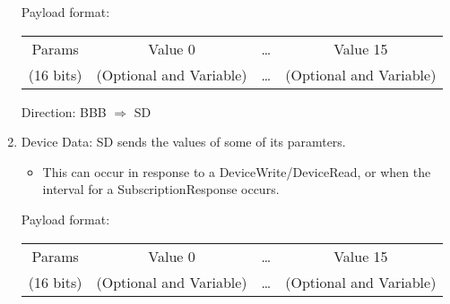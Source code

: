 \documentclass[12pt]{book}
\begin{document}
\begin{enumerate}
        Payload format:
        \begin{center}
            \begin{tabular}{|c|c|c|c|}
                \hline
                Params & Value 0 & \ldots & Value 15 \\
                (16 bits) & (Optional and Variable) & \ldots & (Optional and Variable) \\
                \hline
            \end{tabular}
        \end{center}
        Direction: BBB $\Rightarrow$ SD
    \item Device Data: SD sends the values of some of its paramters.
        \begin{itemize}
            \item This can occur in response to a DeviceWrite/DeviceRead, or when the
                interval for a SubscriptionResponse occurs.
        \end{itemize}
        Payload format:
        \begin{center}
            \begin{tabular}{|c|c|c|c|}
                \hline
                Params & Value 0 & \ldots & Value 15 \\
                (16 bits) & (Optional and Variable) & \ldots & (Optional and Variable) \\
                \hline
            \end{tabular}
        \end{center}


\end{enumerate}
\end{document}

